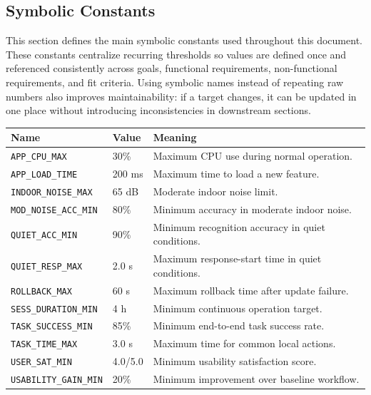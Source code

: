 \documentclass[12pt]{article}
\renewcommand{\arraystretch}{1.15}
\begin{document}
\subsection{Symbolic Constants}
\label{sec:symbolic-constants}
\begin{samepage}
\vspace{-0.5\baselineskip}
This section defines the main symbolic constants used throughout this
document. These constants centralize recurring thresholds so values are
defined once and referenced consistently across goals, functional
requirements, non-functional requirements, and fit criteria. Using
symbolic names instead of repeating raw numbers also improves
maintainability: if a target changes, it can be updated in one place
without introducing inconsistencies in downstream sections.

\begingroup
\small
\setlength{\tabcolsep}{6pt}
\renewcommand{\arraystretch}{1.35}
\captionsetup{aboveskip=4pt, belowskip=4pt}
\begin{center}
\label{tab:symbolic-constants}
\begin{tabularx}{0.92\textwidth}{p{3.35cm}p{2.0cm}X}
\toprule
\textbf{Name} & \textbf{Value} & \textbf{Meaning} \\
\midrule
\texttt{APP\_CPU\_MAX} & 30\% &
Maximum CPU use during normal operation. \\
\texttt{APP\_LOAD\_TIME} & 200 ms &
Maximum time to load a new feature. \\
\texttt{INDOOR\_NOISE\_MAX} & 65 dB &
Moderate indoor noise limit. \\
\texttt{MOD\_NOISE\_ACC\_MIN} & 80\% &
Minimum accuracy in moderate indoor noise. \\
\texttt{QUIET\_ACC\_MIN} & 90\% &
Minimum recognition accuracy in quiet conditions. \\
\texttt{QUIET\_RESP\_MAX} & 2.0 s &
Maximum response-start time in quiet conditions. \\
\texttt{ROLLBACK\_MAX} & 60 s &
Maximum rollback time after update failure. \\
\texttt{SESS\_DURATION\_MIN} & 4 h &
Minimum continuous operation target. \\
\texttt{TASK\_SUCCESS\_MIN} & 85\% &
Minimum end-to-end task success rate. \\
\texttt{TASK\_TIME\_MAX} & 3.0 s &
Maximum time for common local actions. \\
\texttt{USER\_SAT\_MIN} & 4.0/5.0 &
Minimum usability satisfaction score. \\
\texttt{USABILITY\_GAIN\_MIN} & 20\% &
Minimum improvement over baseline workflow. \\
\bottomrule
\end{tabularx}
\end{center}
\endgroup
\end{samepage}
\end{document}
